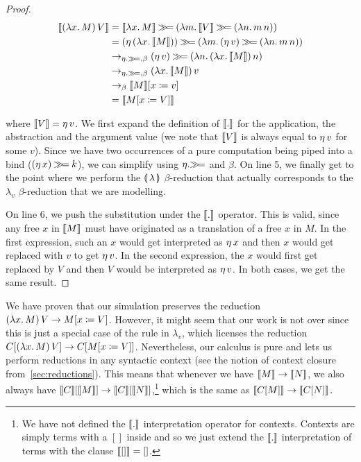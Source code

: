 \begin{proof}

\NoChapterPrefix
\begin{align}
  \llbracket (\lambda x.\, M)\,V \rrbracket
&= \llbracket \lambda x.\, M \rrbracket \mathbin{\gg\!=} (\lambda m.\, \llbracket V \rrbracket \mathbin{\gg\!=} (\lambda n.\, m\,n)) \\
&= (\eta\,(\lambda x.\, \llbracket M \rrbracket)) \mathbin{\gg\!=} (\lambda m.\, (\eta\,v) \mathbin{\gg\!=} (\lambda n.\, m\,n)) \\
&\to_{\eta.\mathbin{\gg\!=},\beta} (\eta\,v) \mathbin{\gg\!=} (\lambda n.\, (\lambda x.\, \llbracket M \rrbracket)\,n) \\
&\to_{\eta.\mathbin{\gg\!=},\beta} (\lambda x.\, \llbracket M \rrbracket)\,v \\
&\to_{\beta} \llbracket M \rrbracket[x \coloneqq v] \\
&= \llbracket M[x \coloneqq V] \rrbracket
\end{align}
\setcounter{equation}{0}
\ChapterPrefix

where $\llbracket V \rrbracket = \eta\,v$. We first expand the definition of $\llbracket . \rrbracket$
for the application, the abstraction and the argument value (we note that
$\llbracket V \rrbracket$ is always equal to $\eta\,v$ for some $v$). Since we have
two occurrences of a pure computation being piped into a bind
($(\eta\,x) \mathbin{\gg\!=} k$), we can simplify using $\eta.\mathbin{\gg\!=}$ and
$\beta$. On line 5, we finally get to the point where we perform the
$\llparenthesis \, \lambda \, \rrparenthesis$ $\beta$-reduction that actually corresponds to the
$\lambda_v$ $\beta$-reduction that we are modelling.

On line 6, we push the substitution under the $\llbracket . \rrbracket$ operator. This is
valid, since any free $x$ in $\llbracket M \rrbracket$ must have originated as a
translation of a free $x$ in $M$. In the first expression, such an $x$
would get interpreted as $\eta\,x$ and then $x$ would get replaced
with $v$ to get $\eta\,v$. In the second expression, the $x$ would
first get replaced by $V$ and then $V$ would be interpreted as
$\eta\,v$. In both cases, we get the same result.

\end{proof}

We have proven that our simulation preserves the reduction
$(\lambda x.\, M)\,V \to M[x \coloneqq V]$. However, it might seem that our
work is not over since this is just a special case of the rule in
$\lambda_v$, which licenses the reduction
$C[(\lambda x.\, M)\,V] \to C[M[x \coloneqq V]]$. Nevertheless, our
calculus is pure and lets us perform reductions in any syntactic context
(see the notion of context closure from~\ref{sec:reductions}). This means
that whenever we have $\llbracket M \rrbracket \to \llbracket N \rrbracket$, we also always have
$\llbracket C \rrbracket[\llbracket M \rrbracket] \to \llbracket C \rrbracket[\llbracket N \rrbracket]$,\footnote{We have not defined the
  $\llbracket . \rrbracket$ interpretation operator for contexts. Contexts are simply terms
  with a $[]$ inside and so we just extend the $\llbracket . \rrbracket$ interpretation of
  terms with the clause $\llbracket [] \rrbracket = []$.} which is the same as
$\llbracket C[M] \rrbracket \to \llbracket C[N] \rrbracket$.

